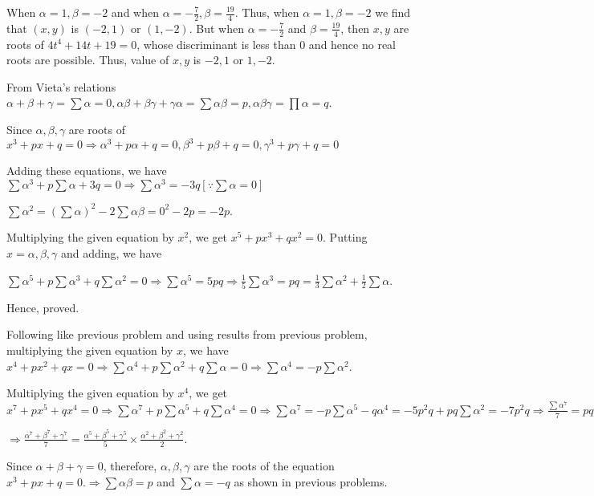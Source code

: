   When $\alpha = 1, \beta = -2$ and when $\alpha = -\frac{7}{2}, \beta = \frac{19}{4}$. Thus, when $\alpha
  =1, \beta = -2$ we find that $(x, y)$ is $(-2, 1)$ or $(1, -2)$. But when $\alpha = -\frac{7}{2}$ and
  $\beta = \frac{19}{4}$, then $x, y$ are roots of $4t^4 + 14t + 19 = 0$, whose discriminant is less than
  $0$ and hence no real roots are possible. Thus, value of $x, y$ is $-2, 1$ or $1, -2$.
\item From Vieta's relations $\alpha + \beta + \gamma = \sum \alpha = 0, \alpha\beta + \beta\gamma +
  \gamma\alpha = \sum \alpha\beta = p, \alpha\beta\gamma = \prod\alpha = q$.

  Since $\alpha, \beta, \gamma$ are roots of $x^3 + px + q = 0 \Rightarrow \alpha^3 + p\alpha + q = 0,
  \beta^3 + p\beta + q = 0, \gamma^3 + p\gamma + q = 0$

  Adding these equations, we have $\sum\alpha^3 + p\sum\alpha + 3q = 0 \Rightarrow \sum\alpha^3 =
  -3q[\because \sum\alpha = 0]$

  $\sum\alpha^2 = (\sum\alpha)^2 - 2\sum\alpha\beta = 0^2 - 2p = -2p$.

  Multiplying the given equation by $x^2$, we get $x^5 + px^3 + qx^2 = 0$. Putting $x = \alpha, \beta,
  \gamma$ and adding, we have

  $\sum\alpha^5 + p\sum\alpha^3 + q\sum\alpha^2 = 0 \Rightarrow \sum\alpha^5 = 5pq\Rightarrow
  \frac{1}{5}\sum\alpha^3 = pq = \frac{1}{3}\sum\alpha^2 + \frac{1}{2}\sum\alpha$.

  Hence, proved.
\item Following like previous problem and using results from previous problem, multiplying the given
  equation by $x$, we have $x^4 + px^2 + qx = 0 \Rightarrow \sum\alpha^4 + p\sum\alpha^2 + q\sum\alpha =
  0\Rightarrow \sum\alpha^4 = -p\sum\alpha^2$.

  Multiplying the given equation by $x^4$, we get $x^7 + px^5 + qx^4 = 0 \Rightarrow \sum\alpha^7 +
  p\sum\alpha^5 + q\sum\alpha^4 = 0\Rightarrow \sum\alpha^7 = -p\sum\alpha^5 - q\alpha^4 = -5p^2q +
  pq\sum\alpha^2 = -7p^2q \Rightarrow \frac{\sum\alpha^7}{7} = pq.(-q) =
  \frac{\sum\alpha^5}{5}.\frac{\sum\alpha^2}{2}$

  $\Rightarrow \frac{\alpha^7 + \beta^7 + \gamma^7}{7} = \frac{\alpha^5 + \beta^5 + \gamma^5}{5}\times
  \frac{\alpha^2 + \beta^2 + \gamma^2}{2}$.
\item Since $\alpha + \beta + \gamma = 0$, therefore, $\alpha, \beta, \gamma$ are the roots of the equation
  $x^3 + px + q = 0.\Rightarrow \sum\alpha\beta = p$ and $\sum\alpha = -q$ as shown in previous problems.

